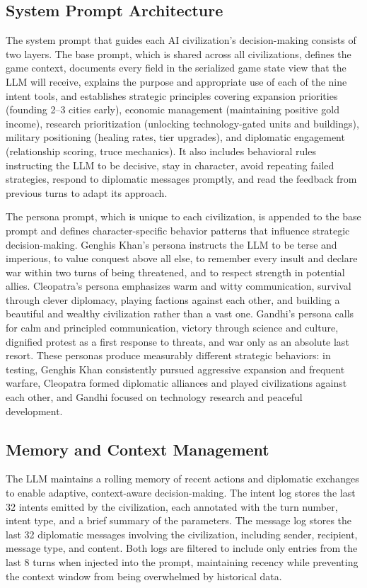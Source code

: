 \documentclass[conference]{IEEEtran}
\begin{document}
\subsection{System Prompt Architecture}

The system prompt that guides each AI civilization's decision-making consists of two layers. The base prompt, which is shared across all civilizations, defines the game context, documents every field in the serialized game state view that the LLM will receive, explains the purpose and appropriate use of each of the nine intent tools, and establishes strategic principles covering expansion priorities (founding 2--3 cities early), economic management (maintaining positive gold income), research prioritization (unlocking technology-gated units and buildings), military positioning (healing rates, tier upgrades), and diplomatic engagement (relationship scoring, truce mechanics). It also includes behavioral rules instructing the LLM to be decisive, stay in character, avoid repeating failed strategies, respond to diplomatic messages promptly, and read the feedback from previous turns to adapt its approach.

The persona prompt, which is unique to each civilization, is appended to the base prompt and defines character-specific behavior patterns that influence strategic decision-making. Genghis Khan's persona instructs the LLM to be terse and imperious, to value conquest above all else, to remember every insult and declare war within two turns of being threatened, and to respect strength in potential allies. Cleopatra's persona emphasizes warm and witty communication, survival through clever diplomacy, playing factions against each other, and building a beautiful and wealthy civilization rather than a vast one. Gandhi's persona calls for calm and principled communication, victory through science and culture, dignified protest as a first response to threats, and war only as an absolute last resort. These personas produce measurably different strategic behaviors: in testing, Genghis Khan consistently pursued aggressive expansion and frequent warfare, Cleopatra formed diplomatic alliances and played civilizations against each other, and Gandhi focused on technology research and peaceful development.

\subsection{Memory and Context Management}

The LLM maintains a rolling memory of recent actions and diplomatic exchanges to enable adaptive, context-aware decision-making. The intent log stores the last 32 intents emitted by the civilization, each annotated with the turn number, intent type, and a brief summary of the parameters. The message log stores the last 32 diplomatic messages involving the civilization, including sender, recipient, message type, and content. Both logs are filtered to include only entries from the last 8 turns when injected into the prompt, maintaining recency while preventing the context window from being overwhelmed by historical data.
\end{document}

